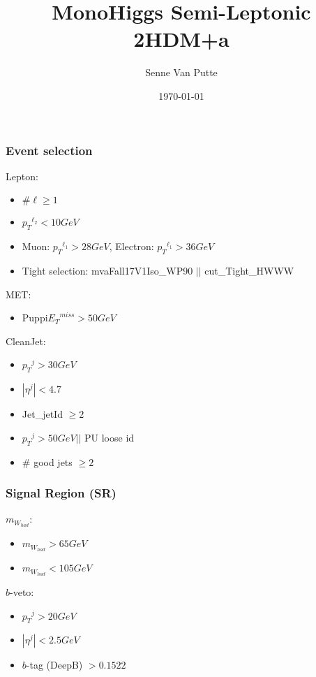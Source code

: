 \documentclass{beamer}
\title{ MonoHiggs Semi-Leptonic 2HDM+a}
\author{ Senne Van Putte }
\institute[UAntwerpen] %
{
University of Antwerp \\ %
\medskip
}
\date{\today} %
\begin{document}
\begin{frame}
\titlepage %
\end{frame}



\begin{frame}
    \frametitle{Event selection}
    Lepton:
    \begin{itemize}
        \item $\# \ell \geqslant 1$
        \item ${p_{T}}^{\ell_{2}} < 10 GeV$
        \item Muon: $ {p_{T}}^{\ell_{1}} > 28 GeV $, Electron: $ {p_{T}}^{\ell_{1}} > 36 GeV $
        \item Tight selection: mvaFall17V1Iso\_WP90 $ || $ cut\_Tight\_HWWW 
    \end{itemize}
    MET:
    \begin{itemize}
        \item Puppi${{E}_{T}}^{miss} > 50 GeV$ 
    \end{itemize}
    CleanJet:
    \begin{itemize}
        \item ${p_{T}}^{j} > 30 GeV$ 
        \item $|{\eta}^{j}| < 4.7 $
        \item Jet\_jetId $\geqslant 2$
        \item ${p_{T}}^{j} > 50 GeV || $ PU loose id
        \item $\# $ good jets $ \geqslant 2$  
    \end{itemize}
\end{frame}

\begin{frame}
    \frametitle{Signal Region (SR)}
    ${m_{W_{had}}}$:
    \begin{itemize}
        \item ${m_{W_{had}}} > 65 GeV$
        \item ${m_{W_{had}}} < 105 GeV$
    \end{itemize}
    $b$-veto:
    \begin{itemize}
       \item ${p_{T}}^{j} > 20 GeV$ 
       \item $|{\eta}^{j}| < 2.5 GeV$
       \item $b$-tag (DeepB) $>  0.1522$  
    \end{itemize}
\end{frame}
\end{document}
